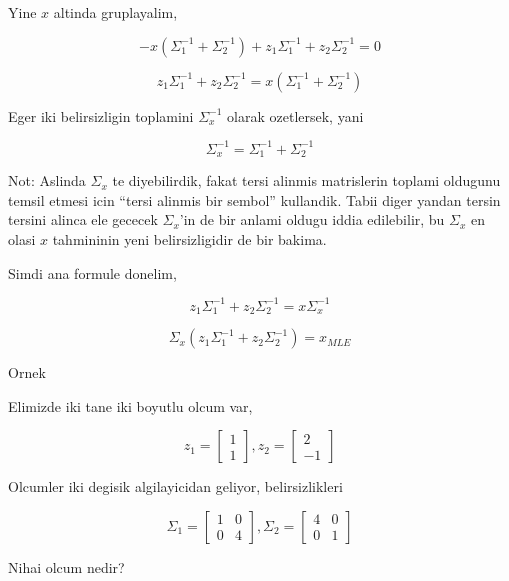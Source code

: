 \documentclass[12pt,fleqn]{article}\usepackage{../common}
\begin{document}
Yine $x$ altinda gruplayalim,

$$ 
-x(\Sigma_1^{-1} + \Sigma_2^{-1}) + z_1\Sigma_1^{-1}  + z_2\Sigma_2^{-1}  = 0
$$

$$ 
z_1\Sigma_1^{-1}  + z_2\Sigma_2^{-1}  = x(\Sigma_1^{-1} + \Sigma_2^{-1}) 
$$

Eger iki belirsizligin toplamini $\Sigma_x^{-1}$ olarak ozetlersek, yani 

$$ 
\Sigma_x^{-1} = \Sigma_1^{-1} + \Sigma_2^{-1}
$$

Not: Aslinda $\Sigma_x$ te diyebilirdik, fakat tersi alinmis matrislerin
toplami oldugunu temsil etmesi icin ``tersi alinmis bir sembol''
kullandik. Tabii diger yandan tersin tersini alinca ele gececek
$\Sigma_x$'in de bir anlami oldugu iddia edilebilir, bu $\Sigma_x$ en olasi
$x$ tahmininin yeni belirsizligidir de bir bakima. 

Simdi ana formule donelim,

$$ 
z_1\Sigma_1^{-1}  + z_2\Sigma_2^{-1}  = x\Sigma_x^{-1}
$$


$$ 
\Sigma_x (z_1\Sigma_1^{-1}  + z_2\Sigma_2^{-1}) = x_{MLE}
$$

Ornek

Elimizde iki tane iki boyutlu olcum var, 

$$ z_1 = \left[\begin{array}{c}
1 \\ 1
\end{array}\right], 
z_2 = \left[\begin{array}{r}
2 \\ -1
\end{array}\right] 
$$

Olcumler iki degisik algilayicidan geliyor, belirsizlikleri

$$ 
\Sigma_1 = 
\left[\begin{array}{cc}
1 & 0 \\ 0 & 4
\end{array}\right], 
\Sigma_2 = 
\left[\begin{array}{cc}
4 & 0 \\ 0 & 1
\end{array}\right]
 $$

Nihai olcum nedir? 
\end{document}
